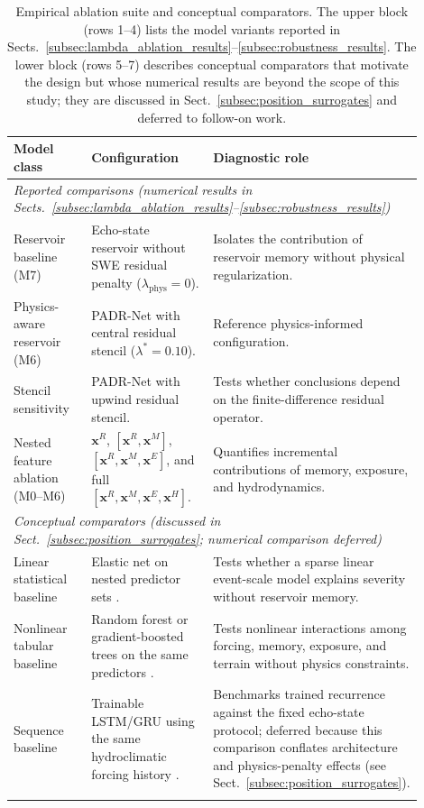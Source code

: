 \documentclass[pdflatex,sn-mathphys-ay]{sn-jnl}
\theoremstyle{thmstyleone}
\begin{document}
\begin{table}[p]
\centering
\small
\caption{Empirical ablation suite and conceptual comparators.  The
upper block (rows 1--4) lists the model variants reported in
Sects.~\ref{subsec:lambda_ablation_results}--\ref{subsec:robustness_results}.
The lower block (rows 5--7) describes conceptual comparators that
motivate the design but whose numerical results are beyond the scope
of this study; they are discussed in
Sect.~\ref{subsec:position_surrogates} and deferred to follow-on
work.}
\label{tab:baseline_suite}
\begin{tabular}{p{0.22\linewidth}p{0.34\linewidth}p{0.34\linewidth}}
\toprule
Model class & Configuration & Diagnostic role \\
\midrule
\multicolumn{3}{l}{\emph{Reported comparisons (numerical results in Sects.~\ref{subsec:lambda_ablation_results}--\ref{subsec:robustness_results})}} \\[2pt]
Reservoir baseline (M7) & Echo-state reservoir without SWE residual penalty ($\lambda_{\mathrm{phys}}=0$). & Isolates the contribution of reservoir memory without physical regularization. \\
Physics-aware reservoir (M6) & PADR-Net with central residual stencil ($\lambda^{*}=0.10$). & Reference physics-informed configuration. \\
Stencil sensitivity & PADR-Net with upwind residual stencil. & Tests whether conclusions depend on the finite-difference residual operator. \\
Nested feature ablation (M0--M6) & $\mathbf{x}^{R}$, $[\mathbf{x}^{R},\mathbf{x}^{M}]$, $[\mathbf{x}^{R},\mathbf{x}^{M},\mathbf{x}^{E}]$, and full $[\mathbf{x}^{R},\mathbf{x}^{M},\mathbf{x}^{E},\mathbf{x}^{H}]$. & Quantifies incremental contributions of memory, exposure, and hydrodynamics. \\
\midrule
\multicolumn{3}{l}{\emph{Conceptual comparators (discussed in Sect.~\ref{subsec:position_surrogates}; numerical comparison deferred)}} \\[2pt]
Linear statistical baseline & Elastic net on nested predictor sets \citep{Tibshirani1996,Zou2005regvars}. & Tests whether a sparse linear event-scale model explains severity without reservoir memory. \\
Nonlinear tabular baseline & Random forest or gradient-boosted trees on the same predictors \citep{Breiman2001RandomForests,ChenGuestrin2016}. & Tests nonlinear interactions among forcing, memory, exposure, and terrain without physics constraints. \\
Sequence baseline & Trainable LSTM/GRU using the same hydroclimatic forcing history \citep{Hochreiter1997,Kratzert2019}. & Benchmarks trained recurrence against the fixed echo-state protocol; deferred because this comparison conflates architecture and physics-penalty effects (see Sect.~\ref{subsec:position_surrogates}). \\
\botrule
\end{tabular}
\end{table}
\end{document}
